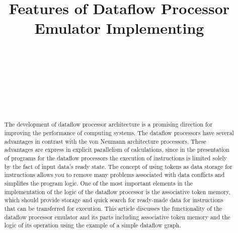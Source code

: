\documentclass[
11pt,%
tightenlines,%
twoside,%
onecolumn,%
nofloats,%
nobibnotes,%
nofootinbib,%
superscriptaddress,%
noshowpacs,%
centertags]%
{revtex4}
\begin{document}

\title{Features of Dataflow Processor Emulator Implementing}

\author{~}

\author{~}

\author{~}

\author{~}



\begin{abstract}
The development of dataflow processor architecture is a promising direction for improving the performance of computing systems.
The dataflow processors have several advantages in contrast with the von Neumann architecture processors.
These advantages are express in explicit parallelism of calculations, since in the presentation of programs for the dataflow processors the execution of instructions is limited solely by the fact of input data’s ready state.
The concept of using tokens as data storage for instructions allows you to remove many problems associated with data conflicts and simplifies the program logic.
One of the most important elements in the implementation of the logic of the dataflow processor is the associative token memory, which should provide storage and quick search for ready-made data for instructions that can be transferred for execution.
This article discusses the functionality of the dataflow processor emulator and its parts including associative token memory and the logic of its operation using the example of a simple dataflow graph.
\end{abstract}
\end{document}

